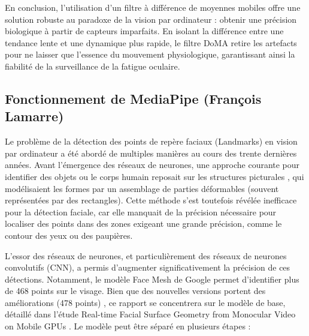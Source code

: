 \documentclass{rapportbrebeuf}
\begin{document}
En conclusion, l'utilisation d'un filtre à différence de moyennes mobiles offre une solution
robuste au paradoxe de la vision par ordinateur : obtenir une précision biologique à partir de
capteurs imparfaits. En isolant la différence entre une tendance lente et une dynamique plus
rapide, le filtre DoMA retire les artefacts pour ne laisser que l'essence du
mouvement physiologique, garantissant ainsi la fiabilité de la surveillance de la fatigue oculaire.

\newpage
\subsection{Fonctionnement de MediaPipe (François Lamarre)}

Le problème de la détection des points de repère faciaux (Landmarks) en vision par ordinateur a été abordé de multiples manières au cours des trente dernières années. Avant l'émergence des réseaux de neurones, une approche courante pour identifier des objets ou le corps humain reposait sur les structures picturales \cite{felzenszwalb2005pictorial}, qui modélisaient les formes par un assemblage de parties déformables (souvent représentées par des rectangles). Cette méthode s'est toutefois révélée inefficace pour la détection faciale, car elle manquait de la précision nécessaire pour localiser des points dans des zones exigeant une grande précision, comme le contour des yeux ou des paupières.

L'essor des réseaux de neurones, et particulièrement des réseaux de neurones convolutifs (CNN), a permis d'augmenter significativement la précision de ces détections. Notamment, le modèle Face Mesh de Google permet d’identifier plus de 468 points sur le visage. Bien que des nouvelles versions portent des améliorations (478 points) \cite{ablavatski2020attention}, ce rapport se concentrera sur le modèle de base, détaillé dans l'étude Real-time Facial Surface Geometry from Monocular Video on Mobile GPUs \cite{kartynnik2019realtime}.\newline
Le modèle peut être séparé en plusieurs étapes :
\end{document}
